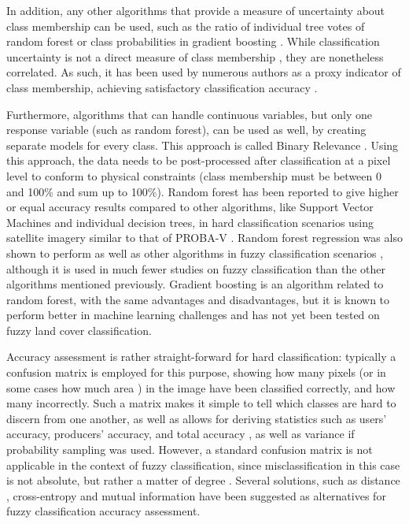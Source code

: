 \documentclass[a4paper,10pt]{book}
\begin{document}
In addition, any other algorithms that provide a measure of uncertainty about class membership can be used, such as the ratio of individual tree votes of random forest \citep{breiman2001random} or class probabilities in gradient boosting \citep{friedman2001gradientboost}. While classification uncertainty is not a direct measure of class membership \citep{sytze2000fuzzyset}, they are nonetheless correlated. As such, it has been used by numerous authors as a proxy indicator of class membership, achieving satisfactory classification accuracy \citep{foody2002accuracy}.

Furthermore, algorithms that can handle continuous variables, but only one response variable (such as random forest), can be used as well, by creating separate models for every class. This approach is called Binary Relevance \citep{karalas2016br}. Using this approach, the data needs to be post-processed after classification at a pixel level to conform to physical constraints (class membership must be between 0 and 100\% and sum up to 100\%). Random forest has been reported to give higher or equal accuracy results compared to other algorithms, like Support Vector Machines and individual decision trees, in hard classification scenarios using satellite imagery similar to that of PROBA-V \citep{duro2012algorithmcomparison}. Random forest regression was also shown to perform as well as other algorithms in fuzzy classification scenarios \citep{walton2008subpixelrf}, although it is used in much fewer studies on fuzzy classification than the other algorithms mentioned previously. Gradient boosting is an algorithm related to random forest, with the same advantages and disadvantages, but it is known to perform better in machine learning challenges \citep{chen2015higgs} and has not yet been tested on fuzzy land cover classification.

Accuracy assessment is rather straight-forward for hard classification: typically a confusion matrix is employed for this purpose, showing how many pixels (or in some cases how much area \citep{stehman2009sampling}) in the image have been classified correctly, and how many incorrectly. Such a matrix makes it simple to tell which classes are hard to discern from one another, as well as allows for deriving statistics such as users' accuracy, producers' accuracy, and total accuracy \citep{foody1996fuzzyevaluation}, as well as variance if probability sampling was used. However, a standard confusion matrix is not applicable in the context of fuzzy classification, since misclassification in this case is not absolute, but rather a matter of degree \citep{foody2002accuracy}. Several solutions, such as distance \citep{foody1996fuzzyevaluation}, cross-entropy and mutual information \citep{lu2007methods} have been suggested as alternatives for fuzzy classification accuracy assessment.
\end{document}
